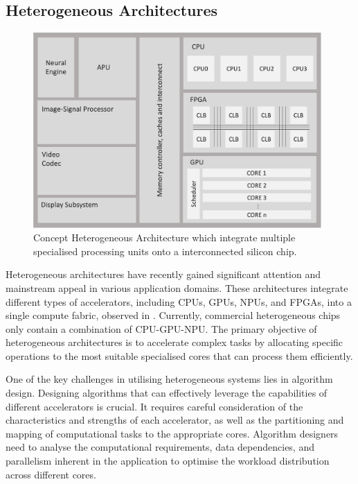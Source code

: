 
\subsection{Heterogeneous Architectures}

\begin{figure}[H]
\centering
\includegraphics[width=11cm]{Images/Heterogenous.png}
\caption[Heterogeneous Architecture]{Concept Heterogeneous Architecture which integrate multiple specialised processing units onto a interconnected silicon chip. }
\label{fig:Heterogeneous}
\end{figure} 
Heterogeneous architectures have recently gained significant attention and mainstream appeal in various application domains. These architectures integrate different types of accelerators, including CPUs, GPUs, NPUs, and FPGAs, into a single compute fabric, observed in . Currently, commercial heterogeneous chips only contain a combination of CPU-GPU-NPU\cite{Intelhet}. The primary objective of heterogeneous architectures is to accelerate complex tasks by allocating specific operations to the most suitable specialised cores that can process them efficiently.

One of the key challenges in utilising heterogeneous systems lies in algorithm design. Designing algorithms that can effectively leverage the capabilities of different accelerators is crucial. It requires careful consideration of the characteristics and strengths of each accelerator, as well as the partitioning and mapping of computational tasks to the appropriate cores. Algorithm designers need to analyse the computational requirements, data dependencies, and parallelism inherent in the application to optimise the workload distribution across different cores.

